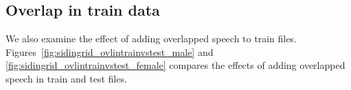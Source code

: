 %
%	

\subsection{Overlap in train data}
We also examine the effect of adding overlapped speech to train files.
Figures~\ref{fig:sidingrid_ovlintrainvstest_male} and \ref{fig:sidingrid_ovlintrainvstest_female} compares the effects of adding overlapped speech in train and test files.

